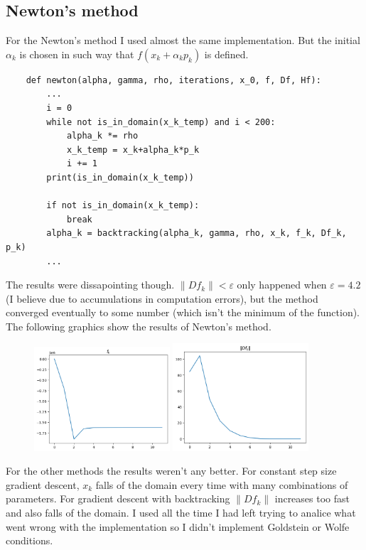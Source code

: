\subsection*{Newton's method}

For the Newton's method I used almost the same implementation. But the initial $\alpha_k$ is chosen in such way that $f(x_k + \alpha_k p_k)$ is defined. 
\begin{verbatim}
    def newton(alpha, gamma, rho, iterations, x_0, f, Df, Hf):
        ...
        i = 0
        while not is_in_domain(x_k_temp) and i < 200:
            alpha_k *= rho
            x_k_temp = x_k+alpha_k*p_k
            i += 1
        print(is_in_domain(x_k_temp))
        
        if not is_in_domain(x_k_temp):
            break
        alpha_k = backtracking(alpha_k, gamma, rho, x_k, f_k, Df_k, p_k)
        ...
\end{verbatim}

The results were dissapointing though. $\|Df_k\| < \varepsilon$ only happened when $\varepsilon = 4.2$ (I believe due to accumulations in computation errors), but the method converged eventually to some number (which isn't the minimum of the function). The following graphics show the results of Newton's method.

\begin{figure}[H]
    \centering
    \includegraphics[width=0.45\textwidth]{../pictures/hw2ex5.4.png}
    \hfill
    \includegraphics[width=0.45\textwidth]{../pictures/hw2ex5.4.1.png}
\end{figure}

For the other methods the results weren't any better. For constant step size gradient descent, $x_k$ falls of the domain every time with many combinations of parameters. For gradient descent with backtracking $\|Df_k\|$ increases too fast and also falls of the domain. I used all the time I had left trying to analice what went wrong with the implementation so I didn't implement Goldstein or Wolfe conditions.